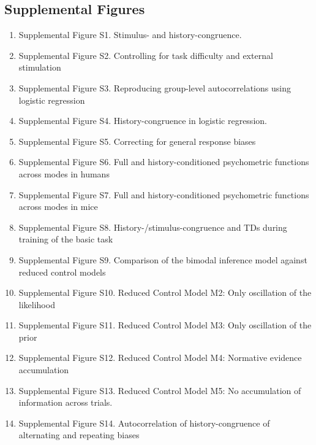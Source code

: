 \documentclass[
]{article}
\begin{document}
\subsection*{{Supplemental Figures}\label{Supplemental Figures}}
\begin{enumerate}
\item Supplemental Figure S1. Stimulus- and history-congruence.
\item Supplemental Figure S2. Controlling for task difficulty and external stimulation
\item Supplemental Figure S3. Reproducing group-level autocorrelations using logistic regression
\item Supplemental Figure S4. History-congruence in logistic regression.
\item Supplemental Figure S5. Correcting for general response biases
\item Supplemental Figure S6. Full and history-conditioned psychometric functions across modes in humans
\item Supplemental Figure S7. Full and history-conditioned psychometric functions across modes in mice
\item Supplemental Figure S8. History-/stimulus-congruence and TDs during training of the basic task
\item Supplemental Figure S9. Comparison of the bimodal inference model against reduced control models
\item Supplemental Figure S10. Reduced Control Model M2: Only oscillation of the likelihood
\item Supplemental Figure S11. Reduced Control Model M3: Only oscillation of the prior
\item Supplemental Figure S12. Reduced Control Model M4: Normative evidence accumulation
\item Supplemental Figure S13. Reduced Control Model M5: No accumulation of information across trials.
\item Supplemental Figure S14. Autocorrelation of history-congruence of alternating and repeating biases
\end{enumerate}
 
\end{document}
